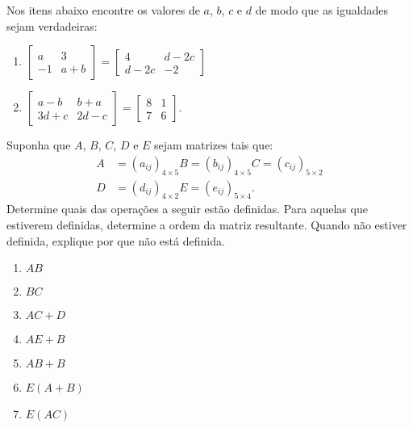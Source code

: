 \documentclass[12pt]{exam}
\begin{document}
    \vspace{.3cm}

    \questao{} Nos itens abaixo encontre os valores de $a$, $b$, $c$ e $d$ de modo que as igualdades sejam verdadeiras:
    \begin{enumerate}
        \item $\begin{bmatrix}a & 3\\-1 & a + b\end{bmatrix} = \begin{bmatrix}4 & d - 2c\\d - 2c & -2\end{bmatrix}$
        \item $\begin{bmatrix}a - b & b + a\\3d + c & 2d - c\end{bmatrix} = \begin{bmatrix}8 & 1\\7 & 6\end{bmatrix}$.
    \end{enumerate}

    \vspace{.3cm}

    \questao{} Suponha que $A$, $B$, $C$, $D$ e $E$ sejam matrizes tais que:
    \begin{align*}
        A &= (a_{ij})_{4 \times 5}
        B = (b_{ij})_{4 \times 5}
        C = (c_{ij})_{5 \times 2}\\
        D &= (d_{ij})_{4 \times 2}
        E = (e_{ij})_{5 \times 4}.
    \end{align*}
    Determine quais das operações a seguir estão definidas. Para aquelas que estiverem definidas, determine a ordem da matriz resultante. Quando não estiver definida, explique por que não está definida.
    \begin{multicols}{2}
        \begin{enumerate}[label={\arabic*})]
            \item $AB$

            \item $BC$

            \item $AC + D$

            \item $AE + B$

            \item $AB + B$

            \item $E(A + B)$

            \item $E(AC)$

        \end{enumerate}
    \end{multicols}

    \vspace{.3cm}
\end{document}
